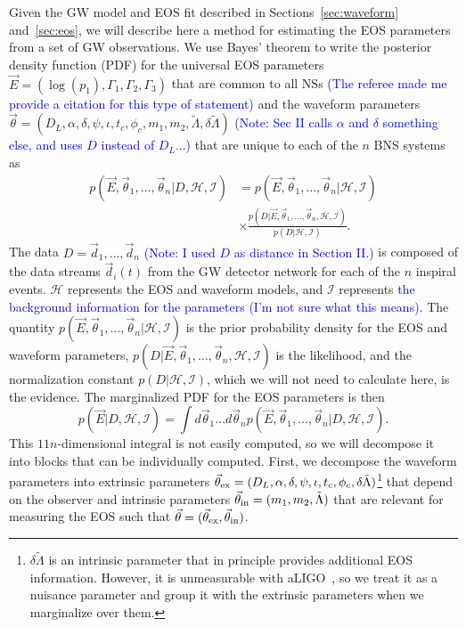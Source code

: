 \documentclass[twocolumn,prd,amssymb,aps,nofootinbib,showpacs,epsf]{revtex4}
\newcommand\les[2]{\textcolor{blue}{{#1}\sout{#2}}}
\begin{document}
Given the GW model and EOS fit described in Sections~\ref{sec:waveform} and~\ref{sec:eos}, we will describe here a method for estimating the EOS parameters from a set of GW observations. We use Bayes' theorem to write the posterior density function (PDF) for the universal EOS parameters $\vec E = (\log(p_1), \Gamma_1, \Gamma_2, \Gamma_3)$ that are common to all NSs \les{(The referee made me provide a citation for this type of statement)}{} and the waveform parameters $\vec\theta = (D_L, \alpha, \delta, \psi, \iota, t_c, \phi_c, m_1, m_2, \tilde\Lambda, \delta\tilde\Lambda)$ \les{(Note: Sec II calls $\alpha$ and $\delta$ something else, and uses $D$ instead of $D_L$...)}{} that are unique to each of the $n$ BNS systems as
\begin{equation}
\begin{split}
p(\vec E,\vec\theta_1,\dots,\vec\theta_n | D,\mathcal{H},\mathcal{I})
&= p(\vec E,\vec\theta_1,\dots,\vec\theta_n | \mathcal{H},\mathcal{I}) \\
& \times\frac{ p(D | \vec E,\vec\theta_1,\dots,\vec\theta_n,\mathcal{H},\mathcal{I}) }{ p(D | \mathcal{H},\mathcal{I}) }.
\end{split}
\end{equation}
The data $D = \vec d_1,\dots, \vec d_n$ \les{(Note: I used $D$ as distance in Section II.)}{} is composed of the data streams $\vec d_i(t)$ from the GW detector network for each of the $n$ inspiral events. $\mathcal{H}$ represents the EOS and waveform models, and $\mathcal{I}$ represents \les{the background information for the parameters (I'm not sure what this means)}{}. The quantity $p(\vec E,\vec\theta_1,\dots,\vec\theta_n | \mathcal{H},\mathcal{I})$ is the prior probability density for the EOS and waveform parameters, $p(D | \vec E,\vec\theta_1,\dots,\vec\theta_n,\mathcal{H},\mathcal{I})$ is the likelihood, and the normalization constant $p(D | \mathcal{H},\mathcal{I})$, which we will not need to calculate here, is the evidence. The marginalized PDF for the EOS parameters is then
\begin{equation}
\label{eq:margEOS}
p(\vec E | D,\mathcal{H},\mathcal{I}) = \int d\vec\theta_1 \dots d\vec\theta_n p(\vec E,\vec\theta_1,\dots,\vec\theta_n | D,\mathcal{H},\mathcal{I}).
\end{equation}
This $11n$-dimensional integral is not easily computed, so we will decompose it into blocks that can be individually computed. First, we decompose the waveform parameters into extrinsic parameters $\vec\theta_{\rm ex} = (D_L, \alpha, \delta, \psi, \iota, t_c, \phi_c, \delta\tilde\Lambda)$\footnote{$\delta\tilde\Lambda$ is an intrinsic parameter that in principle provides additional EOS information. However, it is unmeasurable with aLIGO~\cite{WadeCreightonOchsner2014}, so we treat it as a nuisance parameter and group it with the extrinsic parameters when we marginalize over them.} that depend on the observer and intrinsic parameters $\vec\theta_{\rm in} = (m_1, m_2, \tilde\Lambda)$ that are relevant for measuring the EOS such that $\vec\theta = (\vec\theta_{\rm ex}, \vec\theta_{\rm in})$.
\end{document}
